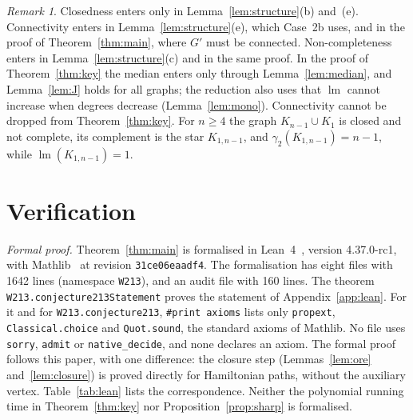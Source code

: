 \documentclass[11pt,a4paper]{article}
\theoremstyle{remark}
\newtheorem{remark}[theorem]{Remark}
\newcommand{\lm}{\operatorname{lm}}
\begin{document}
\begin{remark}
Closedness enters only in Lemma~\ref{lem:structure}(b) and~(e). Connectivity enters in
Lemma~\ref{lem:structure}(e), which Case~2b uses, and in the proof of Theorem~\ref{thm:main},
where $G'$ must be connected. Non-completeness enters in Lemma~\ref{lem:structure}(c) and in the
same proof. In the proof of Theorem~\ref{thm:key} the median enters only through
Lemma~\ref{lem:median}, and Lemma~\ref{lem:J} holds for all graphs; the reduction also uses that $\lm$
cannot increase when degrees decrease (Lemma~\ref{lem:mono}). Connectivity cannot be dropped from Theorem~\ref{thm:key}. For $n\ge 4$ the
graph $K_{n-1}\cup K_1$ is closed and not complete, its complement is the star $K_{1,n-1}$, and
$\gamma_2(K_{1,n-1})=n-1$, while $\lm(K_{1,n-1})=1$.
\end{remark}

\section{Verification}\label{sec:verify}

\emph{Formal proof.} Theorem~\ref{thm:main} is formalised in Lean~4~\cite{lean}, version
4.37.0-rc1, with Mathlib~\cite{mathlib} at revision \texttt{31ce06eaadf4}. The formalisation has
eight files with 1642 lines (namespace \texttt{W213}), and an audit file with 160 lines. The
theorem \texttt{W213.conjecture213Statement} proves the statement of Appendix~\ref{app:lean}.
For it and for \texttt{W213.conjecture213}, \texttt{\#print axioms} lists only
\texttt{propext}, \texttt{Classical.choice} and \texttt{Quot.sound}, the standard axioms of
Mathlib. No file uses \texttt{sorry}, \texttt{admit} or \texttt{native\_decide}, and none
declares an axiom. The formal proof follows this paper, with one difference: the closure
step (Lemmas~\ref{lem:ore} and~\ref{lem:closure}) is proved directly for Hamiltonian paths,
without the auxiliary vertex. Table~\ref{tab:lean} lists the correspondence. Neither the polynomial
running time in Theorem~\ref{thm:key} nor Proposition~\ref{prop:sharp} is formalised.
\end{document}
